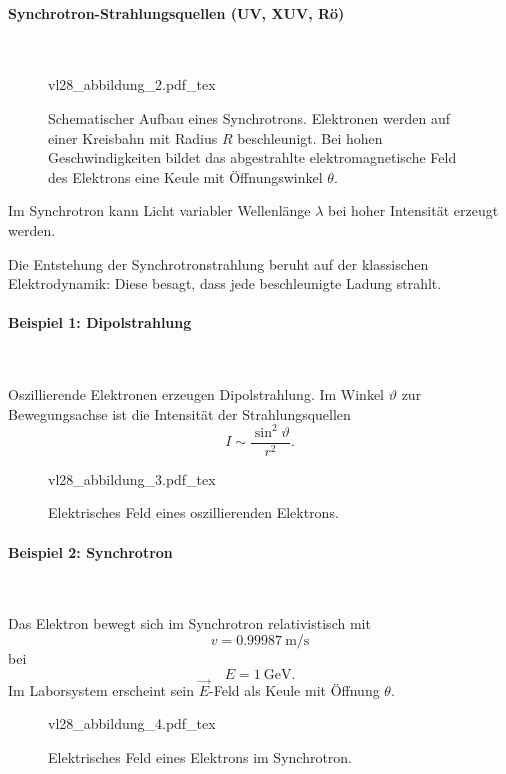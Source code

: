 \paragraph{Synchrotron-Strahlungsquellen (UV, XUV, Rö)}\,\\ 
	\begin{figure}[H]
		\centering
		\def\svgwidth{.246\columnwidth}
		{vl28_abbildung_2.pdf_tex}
		\caption{Schematischer Aufbau eines Synchrotrons. 
			Elektronen werden auf einer Kreisbahn mit Radius $R$ beschleunigt. 
			Bei hohen Geschwindigkeiten bildet das abgestrahlte elektromagnetische Feld des Elektrons eine Keule mit Öffnungswinkel $\theta$.
		}
		\label{fig:vl28_abbildung_2}
	\end{figure}
	Im Synchrotron kann Licht variabler Wellenlänge $\lambda$ bei hoher Intensität erzeugt werden.

	Die Entstehung der Synchrotronstrahlung beruht auf der klassischen Elektrodynamik:
	Diese besagt, dass jede beschleunigte Ladung strahlt.

\paragraph{Beispiel 1: Dipolstrahlung}\,\\
	\begin{minipage}{0.5\linewidth}
		Oszillierende Elektronen erzeugen Dipolstrahlung.
		Im Winkel $\vartheta$ zur Bewegungsachse ist die Intensität der Strahlungsquellen
		$$I\sim\frac{\sin^2\vartheta}{r^2}.$$ 
	\end{minipage}
	\hfill
	\begin{minipage}{0.4\linewidth}
		\begin{figure}[H]
			\centering
			\def\svgwidth{.300\columnwidth}
			{vl28_abbildung_3.pdf_tex}
			\caption{Elektrisches Feld eines oszillierenden Elektrons.}
			\label{fig:vl28_abbildung_3}
		\end{figure}
	\end{minipage}
	

\paragraph{Beispiel 2: Synchrotron}\,\\[1ex]
	\begin{minipage}{0.5\linewidth}
		Das Elektron bewegt sich im Synchrotron relativistisch mit
		$$v=\SI{0,99987}{\meter\per\second}$$
		bei
		$$E=\SI{1}{\giga\electronvolt}.$$
		Im Laborsystem erscheint sein $\vec E$-Feld als Keule mit Öffnung $\theta$.
		\vspace{1em}
	\end{minipage}
	\hfill
	\begin{minipage}{0.4\linewidth}
		\begin{figure}[H]
			\centering
			\def\svgwidth{.450\columnwidth}
			{vl28_abbildung_4.pdf_tex}
			\caption{Elektrisches Feld eines Elektrons im Synchrotron.}
			\label{fig:vl28_abbildung_4}
		\end{figure}
	\end{minipage}
	
